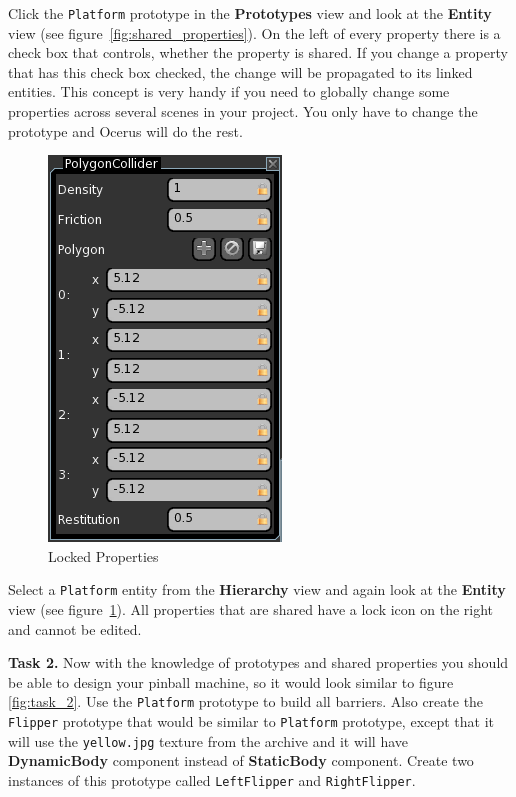 \documentclass[a4paper,12pt]{article}
\begin{document}
Click the \texttt{Platform} prototype in the \textbf{Prototypes} view and look at the \textbf{Entity} view (see figure~\ref{fig:shared_properties}). On the left of every property there is a check box that controls, whether the property is shared. If you change a property that has this check box checked, the change will be propagated to its linked entities. This concept is very handy if you need to globally change some properties across several scenes in your project. You only have to change the prototype and Ocerus will do the rest.

\begin{figure}
\vspace{-20pt}
\capstart
\begin{center}
  \includegraphics[scale=0.65]{LockedProperties}
 \end{center}
 \vspace{-20pt}
 \caption{Locked Properties}
 \label{fig:locked_properties}
 \vspace{-10pt}
\end{figure}

Select a \texttt{Platform} entity from the \textbf{Hierarchy} view and again look at the \textbf{Entity} view (see figure~\ref{fig:locked_properties}). All properties that are shared have a lock icon on the right and cannot be edited.

\textbf{Task 2.} Now with the knowledge of prototypes and shared properties you should be able to design your pinball machine, so it would look similar to figure \ref{fig:task_2}. Use the \texttt{Platform} prototype to build all barriers. Also create the \texttt{Flipper} prototype that would be similar to \texttt{Platform} prototype, except that it will use the \texttt{yellow.jpg} texture from the archive and it will have \textbf{DynamicBody} component instead of \textbf{StaticBody} component. Create two instances of this prototype called \texttt{LeftFlipper} and \texttt{RightFlipper}.
\end{document}
